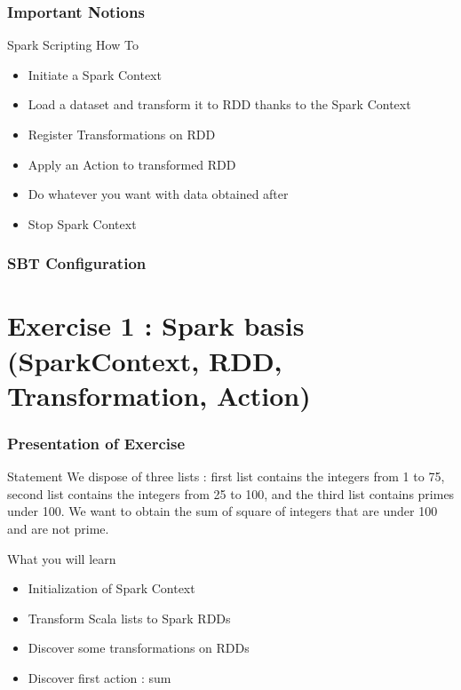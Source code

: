 \documentclass[slidetop,9pt,utf8]{beamer}
\begin{document}
\begin{CJK}{UTF8}{gbsn}
\begin{frame}
\end{frame}

\begin{frame}
  \frametitle{Important Notions}

  \begin{block}{Spark Scripting How To}
    \begin{itemize}
      \item Initiate a Spark Context
      \item Load a dataset and transform it to RDD thanks to the Spark Context
      \item Register Transformations on RDD
      \item Apply an Action to transformed RDD
      \item Do whatever you want with data obtained after 
      \item Stop Spark Context
    \end{itemize}
  \end{block}

\end{frame}

\begin{frame}
  \frametitle{SBT Configuration}

  

\end{frame}

\section{Exercise 1 : Spark basis (SparkContext, RDD, Transformation, Action)}

\begin{frame}
  \frametitle{Presentation of Exercise}

  \begin{block}{Statement}
    We dispose of three lists : first list contains the integers from 1 to 75, second list contains the integers from 25 to 100, and the third list contains primes under 100. We want to obtain the sum of square of integers that are under 100 and are not prime.
  \end{block}

  \begin{block}{What you will learn}
    \begin{itemize}
      \item Initialization of Spark Context
      \item Transform Scala lists to Spark RDDs
      \item Discover some transformations on RDDs
      \item Discover first action : sum
    \end{itemize}
  \end{block}


\end{frame}
\end{CJK}
\end{document}
